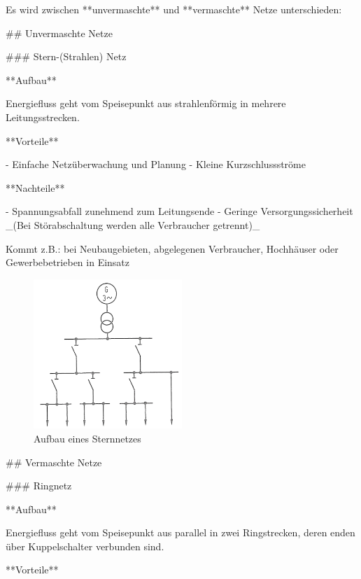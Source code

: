 \begin{markdown}

Es wird zwischen **unvermaschte** und **vermaschte** Netze unterschieden:

\vspace{1em}

## Unvermaschte Netze

### Stern-(Strahlen) Netz

**Aufbau**

Energiefluss geht vom Speisepunkt aus strahlenförmig in mehrere Leitungsstrecken.

**Vorteile**

- Einfache Netzüberwachung und Planung
- Kleine Kurzschlussströme

**Nachteile**

- Spannungsabfall zunehmend zum Leitungsende
- Geringe Versorgungssicherheit _(Bei Störabschaltung werden alle Verbraucher getrennt)_

Kommt z.B.: bei Neubaugebieten, abgelegenen Verbraucher, Hochhäuser oder Gewerbebetrieben in Einsatz

\begin{figure}[H]
    \centering
    \includegraphics[width=0.5\textwidth]{./images/01-Netze/Sternnetz.png}
    \caption[Aufbau eines Stern-(Strahlen) Netzes]{Aufbau eines Sternnetzes}
\end{figure}

\newpage

## Vermaschte Netze

### Ringnetz

**Aufbau**

Energiefluss geht vom Speisepunkt aus parallel in zwei Ringstrecken, deren enden über Kuppelschalter verbunden sind.

**Vorteile**


\end{markdown}
